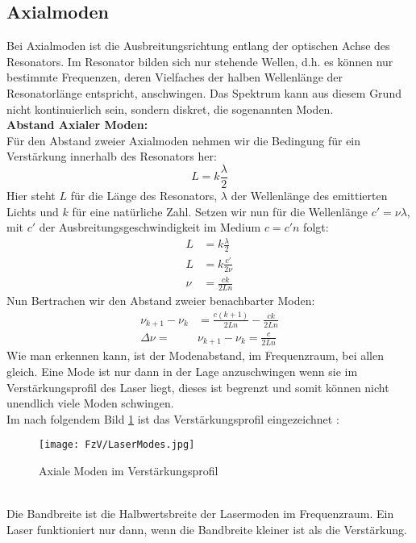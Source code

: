 \subsection{Axialmoden}
Bei Axialmoden ist die Ausbreitungsrichtung entlang der optischen Achse des Resonators.
Im Resonator bilden sich nur stehende Wellen, d.h. es können nur bestimmte Frequenzen, deren Vielfaches der halben Wellenlänge der Resonatorlänge entspricht, anschwingen.
Das Spektrum kann aus diesem Grund nicht kontinuierlich sein, sondern diskret, die sogenannten Moden. \\
\textbf{Abstand Axialer Moden:}\\
Für den Abstand zweier Axialmoden nehmen wir die Bedingung für ein Verstärkung innerhalb des Resonators her:
\begin{equation}
    L=k\frac{\lambda}{2}
\end{equation}
Hier steht $L$ für die Länge des Resonators, $\lambda$ der Wellenlänge des emittierten Lichts und $k$ für eine natürliche Zahl.
Setzen wir nun für die Wellenlänge $c'=\nu\lambda$, mit $c'$ der Ausbreitungsgeschwindigkeit im Medium $c=c'n$ folgt:
\begin{align}
    L&=k\frac{\lambda}{2}\\
    L&=k\frac{c'}{2\nu}\\
    \nu&=\frac{ck}{2Ln}
\end{align}
Nun Bertrachen wir den Abstand zweier benachbarter Moden:
\begin{align}
    \nu_{k+1}-\nu_k&=\frac{c(k+1)}{2Ln}-\frac{ck}{2Ln}\\
    \Delta \nu =&\nu_{k+1}-\nu_k =\frac{c}{2Ln} \label{a}
\end{align}
Wie man erkennen kann, ist der Modenabstand, im Frequenzraum, bei allen gleich. 
Eine Mode ist nur dann in der Lage anzuschwingen wenn sie im Verstärkungsprofil des Laser liegt, dieses
ist begrenzt und somit können nicht unendlich viele Moden schwingen. \citep[vgl.][]{Laser-Dem}\\
Im nach folgendem Bild \ref{fig:Amode} ist das Verstärkungsprofil eingezeichnet \citep[vgl.][]{laser}:
\begin{figure}[h]
    \centering
    \texttt{[image: FzV/LaserModes.jpg]}
    \caption{Axiale Moden im Verstärkungsprofil}
    \label{fig:Amode}
\end{figure}\\
Die Bandbreite ist die Halbwertsbreite der Lasermoden im Frequenzraum. Ein Laser funktioniert nur dann, wenn die Bandbreite kleiner ist als die Verstärkung.


